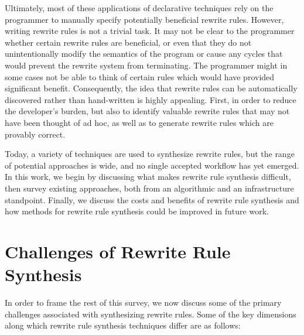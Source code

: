 \documentclass[acmsmall,screen,nonacm]{acmart}
\begin{document}
Ultimately, most of these applications of declarative techniques rely on the programmer to manually specify potentially beneficial rewrite rules. However, writing rewrite rules is not a trivial task. It may not be clear to the programmer whether certain rewrite rules are beneficial, or even that they do not unintentionally modify the semantics of the program or cause any cycles that would prevent the rewrite system from terminating. The programmer might in some cases not be able to think of certain rules which would have provided significant benefit.
Consequently, the idea that rewrite rules can be automatically discovered rather than hand-written is highly appealing. First, in order to reduce the developer's burden, but also to identify valuable rewrite rules that may not have been thought of ad hoc, as well as to generate rewrite rules which are provably correct. 

Today, a variety of techniques are used to synthesize rewrite rules, but the range of potential approaches is wide, and no single accepted workflow has yet emerged. In this work, we begin by discussing what makes rewrite rule synthesis difficult, then survey existing approaches, both from an algorithmic and an infrastructure standpoint. Finally, we discuss the costs and benefits of rewrite rule synthesis and how methods for rewrite rule synthesis could be improved in future work.

\section{Challenges of Rewrite Rule Synthesis}
\label{sec:challenges}
In order to frame the rest of this survey, we now discuss some of the primary challenges associated with synthesizing rewrite rules. Some of the key dimensions along which rewrite rule synthesis techniques differ are as follows:
\end{document}
